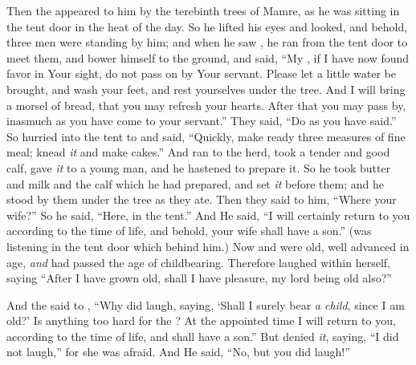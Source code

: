 
\bverse Then the \lord appeared to him by the terebinth trees of Mamre, as he was sitting in the tent door in the heat of the day.
\bverse So he lifted his eyes and looked, and behold, three men were standing by him; and when he saw \them, he ran from the tent door to meet them, and bower himself to the ground,
\bverse and said, ``My \lord, if I have now found favor in Your sight, do not pass on by Your servant.
\bverse Please let a little water be brought, and wash your feet, and rest yourselves under the tree.
\bverse And I will bring a morsel of bread, that you may refresh your hearts. After that you may pass by, inasmuch as you have come to your servant.'' They said, ``Do as you have said.''
\bverse So \Abraham hurried into the tent to \Sarah and said, ``Quickly, make ready three measures of fine meal; knead \textit{it} and make cakes.''
\bverse And \Abraham ran to the herd, took a tender and good calf, gave \textit{it} to a young man, and he hastened to prepare it.
\bverse So he took butter and milk and the calf which he had prepared, and set \textit{it} before them; and he stood by them under the tree as they ate. 
\bverse Then they said to him, ``Where \is \Sarah your wife?'' So he said, ``Here, in the tent.''
\bverse And He said, ``I will certainly return to you according to the time of life, and behold, \Sarah your wife shall have a son.'' (\Sarah was listening in the tent door which \was behind him.)
\bverse Now \Abraham and \Sarah were old, well advanced in age, \textit{and} \Sarah had passed the age of childbearing.
\bverse Therefore \Sarah laughed within herself, saying ``After I have grown old, shall I have pleasure, my lord being old also?''

\bverse And the \lord said to \Abraham, ``Why did \Sarah laugh, saying, `Shall I surely bear \textit{a child}, since I am old?'
\bverse Is anything too hard for the \lord? At the appointed time I will return to you, according to the time of life, and \Sarah shall have a son.''
\bverse But \Sarah denied \textit{it}, saying, ``I did not laugh,'' for she was afraid. And He said, ``No, but you did laugh!''

